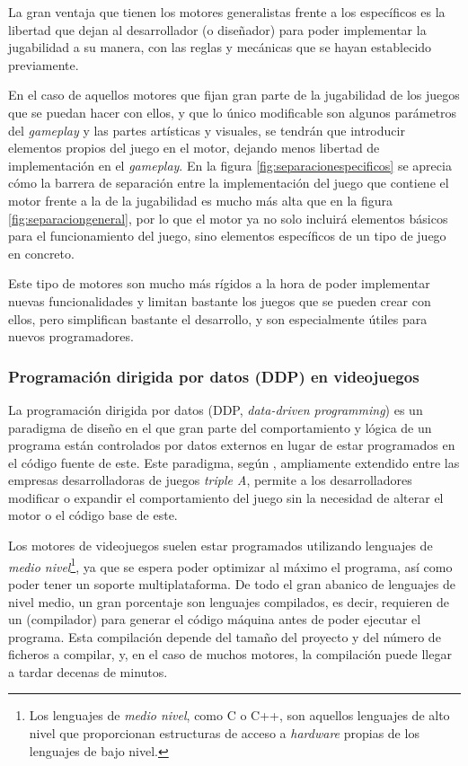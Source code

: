 \smallskip

La gran ventaja que tienen los motores generalistas frente a los específicos es la libertad que dejan al desarrollador (o diseñador) para poder implementar la jugabilidad a su manera, con las reglas y mecánicas que se hayan establecido previamente.

\medskip

En el caso de aquellos motores que fijan gran parte de la jugabilidad de los juegos que se puedan hacer con ellos, y que lo único modificable son algunos parámetros del \textit{gameplay} y las partes artísticas y visuales, se tendrán que introducir elementos propios del juego en el motor, dejando menos libertad de implementación en el \textit{gameplay}. En la figura \ref{fig:separacionespecificos} se aprecia cómo la barrera de separación entre la implementación del juego que contiene el motor frente a la de la jugabilidad es mucho más alta que en la figura \ref{fig:separaciongeneral}, por lo que el motor ya no solo incluirá elementos básicos para el funcionamiento del juego, sino elementos específicos de un tipo de juego en concreto.

\smallskip

Este tipo de motores son mucho más rígidos a la hora de poder implementar nuevas funcionalidades y limitan bastante los juegos que se pueden crear con ellos, pero simplifican bastante el desarrollo, y son especialmente útiles para nuevos programadores.

\subsubsection{Programación dirigida por datos (DDP) en videojuegos}
\label{sec:ddp}
La programación dirigida por datos (DDP, \textit{data-driven programming}) es un paradigma de diseño en el que gran parte del comportamiento y lógica de un programa están controlados por datos externos en lugar de estar programados en el código fuente de este. Este paradigma, según \citeauthor{gregory2018game}, ampliamente extendido entre las empresas desarrolladoras de juegos \textit{triple A}, permite a los desarrolladores modificar o expandir el comportamiento del juego sin la necesidad de alterar el motor o el código base de este.

\medskip

Los motores de videojuegos suelen estar programados utilizando lenguajes de \textit{medio nivel}\footnote{Los lenguajes de \textit{medio nivel}, como C o C++, son aquellos lenguajes de alto nivel que proporcionan estructuras de acceso a \textit{hardware} propias de los lenguajes de bajo nivel.}, ya que se espera poder optimizar al máximo el programa, así como poder tener un soporte multiplataforma. De todo el gran abanico de lenguajes de nivel medio, un gran porcentaje son lenguajes compilados, es decir, requieren de un  (compilador) para generar el código máquina antes de poder ejecutar el programa. Esta compilación depende del tamaño del proyecto y del número de ficheros a compilar, y, en el caso de muchos motores, la compilación puede llegar a tardar decenas de minutos.

